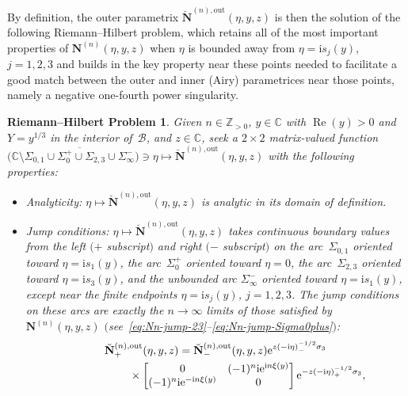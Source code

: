 \documentclass[pdftex]{sigma}
\numberwithin{equation}{section}
\newtheorem{rhp}[Theorem]{Riemann--Hilbert Problem}
 { \theoremstyle{definition}
\newtheorem{Definition}[Theorem]{Definition}
\newtheorem{Note}[Theorem]{Note}
\newtheorem{Example}[Theorem]{Example}
\newtheorem{Remark}[Theorem]{Remark} }
\begin{document}
By definition, the outer parametrix $\breve{\mathbf{N}}^{(n),\mathrm{out}}(\eta,y,z)$ is then the solution of the following Riemann--Hilbert problem, which retains all of the most important properties of $\mathbf{N}^{(n)}(\eta,y,z)$ when $\eta$ is bounded away from $\eta=\mathrm{i} s_j(y)$, $j=1,2,3$ and builds in the key property near these points needed to facilitate a good match between the outer and inner (Airy) parametrices near those points, namely a negative one-fourth power singularity.
\begin{rhp}\label{rhp:genus1outer}
Given $n\in\mathbb{Z}_{>0}$, $y\in\mathbb{C}$ with $\operatorname{Re}(y)>0$ and $Y=y^{1/3}$ in the interior of~$\mathcal{B}$, and $z\in\mathbb{C}$, seek a $2\times 2$ matrix-valued function $\bigl(\mathbb{C}\setminus \overline{\Sigma_{0,1}\cup\Sigma_0^+\cup\Sigma_{2,3}\cup\Sigma_\infty^-}\bigr)\ni\eta\mapsto\breve{\mathbf{N}}^{(n),\mathrm{out}}(\eta,y,z)$ with the following properties:
\begin{itemize}\itemsep=0pt
\item[] Analyticity: $\eta\mapsto\breve{\mathbf{N}}^{(n),\mathrm{out}}(\eta,y,z)$ is analytic in its domain of definition.
\item[]Jump conditions: $\eta\mapsto\breve{\mathbf{N}}^{(n),\mathrm{out}}(\eta,y,z)$ takes continuous boundary values from the left $(+$ subscript$)$ and right $(-$ subscript$)$ on the arc~$\Sigma_{0,1}$ oriented toward $\eta=\mathrm{i} s_1(y)$, the arc~$\Sigma_0^+$ oriented toward $\eta=0$, the arc~$\Sigma_{2,3}$ oriented toward $\eta=\mathrm{i} s_3(y)$, and the unbounded arc $\Sigma_{\infty}^-$ oriented toward $\eta=\mathrm{i} s_1(y)$, except near the finite endpoints $\eta=\mathrm{i} s_j(y)$, $j=1,2,3$. The jump conditions on these arcs are exactly the $n\to\infty$ limits of those satisfied by~$\mathbf{N}^{(n)}(\eta,y,z)$ $($see~\eqref{eq:Nn-jump-23}--\eqref{eq:Nn-jump-Sigma0plus}$)$:
\begin{gather}
 \breve{\mathbf{N}}^{(n),\mathrm{out}}_+(\eta,y,z)
=\breve{\mathbf{N}}^{(n),\mathrm{out}}_-(\eta,y,z)\mathrm{e}^{z(-\mathrm{i}\eta)^{-1/2}_-\sigma_3}\nonumber \\
\hphantom{\breve{\mathbf{N}}^{(n),\mathrm{out}}_+(\eta,y,z)=}{}\times \begin{bmatrix}0 & (-1)^n\mathrm{i}\mathrm{e}^{\mathrm{i} n\xi(y)} \nonumber \\
(-1)^n\mathrm{i}\mathrm{e}^{-\mathrm{i} n\xi(y)} & 0\end{bmatrix}\mathrm{e}^{-z(-\mathrm{i}\eta)^{-1/2}_+\sigma_3}, \qquad

\end{gather}
\end{itemize}
\end{rhp}
\end{document}
